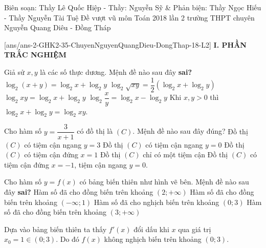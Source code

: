 \begin{name}
	{Biên soạn: Thầy Lê Quốc Hiệp - Thầy: Nguyễn Sỹ \& Phản biện: Thầy Ngọc Hiếu - Thầy Nguyễn Tài Tuệ}
	{Đề vượt vũ môn Toán 2018 lần 2 trường THPT chuyên Nguyễn Quang Diêu - Đồng Tháp}
\end{name}
\setcounter{ex}{0}\setcounter{bt}{0}
[ans/ans-2-GHK2-35-ChuyenNguyenQuangDieu-DongThap-18-L2]
\noindent\textbf{I. PHẦN TRẮC NGHIỆM}
\begin{ex}%
	Giả sử $x,y$ là các số thực dương. Mệnh đề nào sau đây \textbf{sai?}
	\choice
	{\True $\log_2(x+y)=\log_2x+\log_2y$}
	{$\log_2\sqrt{xy}=\dfrac{1}{2}\left(\log_2x+\log_2y\right)$}
	{$\log_2xy=\log_2x+\log_2y$}
	{$\log_2\dfrac{x}{y}=\log_2x-\log_2y$}
	\loigiai
	{
		Khi $x,y>0$ thì $\log_2 x+\log_2 y= \log_2 xy$.
	}
\end{ex}

\begin{ex}%
	Cho hàm số $y=\dfrac{3}{x+1}$ có đồ thị là $(C)$. Mệnh đề nào sau đây đúng? 
	\choice
	{Đồ thị $(C)$ có tiệm cận ngang $y=3$}
	{\True Đồ thị $(C)$ có tiệm cận ngang $y=0$}
	{Đồ thị $(C)$ có tiệm cận đứng $x=1$}
	{Đồ thị $(C)$ chỉ có một tiệm cận}
	\loigiai
	{
		Đồ thị $(C)$ có tiệm cận đứng $x=-1$, tiệm cận ngang $y=0$.
	}
\end{ex}

\begin{ex}%
	\immini
	{
		Cho hàm số $y=f(x)$ có bảng biến thiên như hình vẽ bên. Mệnh đề nào sau đây \textbf{sai?}
		\choice
		{Hàm số đã cho đồng biến trên khoảng $(2;+\infty)$}
		{Hàm số đã cho đồng biến trên khoảng $(-\infty;1)$}
		{\True Hàm số đã cho nghịch biến trên khoảng $(0;3)$}
		{Hàm số đã cho đồng biến trên khoảng $(3;+\infty)$}
	}
	{}
	
	\loigiai
	{
		Dựa vào bảng biến thiên ta thấy $f'(x)$ đổi dấu khi $x$ qua giá trị $x_0=1 \in (0;3)$. Do đó $f(x)$ không nghịch biến trên khoảng $(0;3)$. 
	}
\end{ex}

